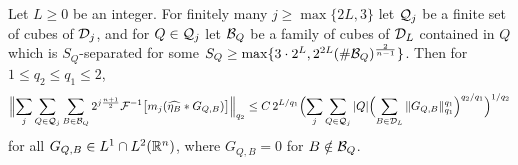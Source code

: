 \begin{lemma}\label{lem:largej}
Let $L\ge0$ be an integer. For finitely many $j\ge\max\{2L,3\}$ let $\mathcal Q_j$ be a finite set of cubes of $\mathcal D_j$,
and for $Q\in\mathcal Q_j$ let $\mathcal B_Q$ be a family of cubes of $\mathcal D_L$ contained in $Q$ which is $S_Q$-separated for
some $S_Q\ge\max\{3\cdot2^L,2^{2L}(\#\mathcal B_Q)^{\frac2{n-1}}\}$. Then for $1\le q_2\le q_1\le2$,
\begin{equation}\label{eq:largej}
\Bigl\|\sum_j\sum_{Q\in\mathcal Q_j}\sum_{B\in\mathcal B_Q}2^{j\frac{n+1}2}\mathcal F^{-1}\bigl[m_j(\widehat{\eta_B}*G_{Q,B})\bigr]\Bigr\|_{q_2}
\le C\,2^{L/q_1}\Bigl(\sum_j\sum_{Q\in\mathcal Q_j}|Q|\Bigl(\sum_{B\in\mathcal D_L}\|G_{Q,B}\|_{q_1}^{q_1}\Bigr)^{q_2/q_1}\Bigr)^{1/q_2}
\end{equation}
for all $G_{Q,B}\in L^1\cap L^2(\mathbb{R}^n)$, where $G_{Q,B}=0$ for $B\notin\mathcal B_Q$.
\end{lemma}

